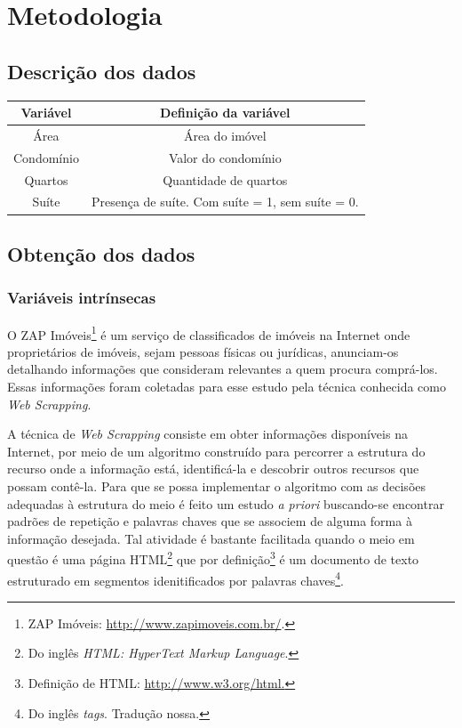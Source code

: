 \pagestyle{empty}
\cleardoublepage
\pagestyle{fancy}

\chapter{Metodologia}\label{chap:metodologia}




\section{Descrição dos dados}\label{sec:descricao_dados}

\begin{table}[htp]
	\begin{center}
		\begin{tabular}{|c|c|}
\hline

\textbf{Variável} & \textbf{Definição da variável}  \\ 
\hline Área & Área do imóvel \\ 
\hline Condomínio & Valor do condomínio \\ 
\hline Quartos & Quantidade de quartos \\ 
\hline Suíte & Presença de suíte. Com suíte = 1, sem suíte = 0. \\ 
\hline 
\end{tabular} 
\end{center}
\end{table}

\section{Obtenção dos dados}

 

\subsection{Variáveis intrínsecas}\label{sec:captura_zap}

O ZAP Imóveis\footnote{ZAP Imóveis: \url{http://www.zapimoveis.com.br/}.} é um serviço de classificados de imóveis na Internet onde proprietários de imóveis, sejam pessoas físicas ou jurídicas, anunciam-os detalhando informações que consideram relevantes a quem procura comprá-los. Essas informações foram coletadas para esse estudo pela técnica conhecida como \textit{Web Scrapping}.

A técnica de \textit{Web Scrapping} consiste em obter informações disponíveis na Internet, por meio de um algoritmo construído para percorrer a estrutura do recurso onde a informação está, identificá-la e descobrir outros recursos que possam contê-la. Para que se possa implementar o algoritmo com as decisões adequadas à estrutura do meio é feito um estudo \textit{a priori} buscando-se encontrar padrões de repetição e palavras chaves que se associem de alguma forma à informação desejada. Tal atividade é bastante facilitada quando o meio em questão é uma página HTML\footnote{Do inglês \textit{HTML: HyperText Markup Language}.} que por definição\footnote{Definição de HTML: \url{http://www.w3.org/html.}} é um documento de texto estruturado em segmentos idenitificados por palavras chaves\footnote{Do inglês \textit{tags}. Tradução nossa.}. 

